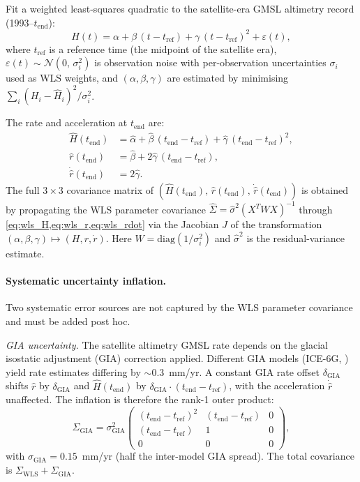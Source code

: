 \documentclass[11pt]{article}
\newcommand{\tend}{t_{\mathrm{end}}}
\begin{document}
Fit a weighted least-squares quadratic to the satellite-era GMSL altimetry record (1993--$\tend$):
\begin{equation}
  H(t) = \alpha + \beta\,(t - t_{\mathrm{ref}}) + \gamma\,(t - t_{\mathrm{ref}})^2 + \varepsilon(t),
  \label{eq:wls_model}
\end{equation}
where $t_{\mathrm{ref}}$ is a reference time (the midpoint of the satellite era), $\varepsilon(t) \sim \mathcal{N}(0,\,\sigma_i^2)$ is observation noise with per-observation uncertainties $\sigma_i$ used as WLS weights, and $(\alpha, \beta, \gamma)$ are estimated by minimising $\sum_i (H_i - \hat{H}_i)^2 / \sigma_i^2$.

The rate and acceleration at $\tend$ are:
\begin{align}
  \hat{H}(\tend) &= \hat\alpha + \hat\beta\,(\tend - t_{\mathrm{ref}}) + \hat\gamma\,(\tend - t_{\mathrm{ref}})^2, \label{eq:wls_H}\\
  \hat{r}(\tend) &= \hat\beta + 2\hat\gamma\,(\tend - t_{\mathrm{ref}}), \label{eq:wls_r}\\
  \dot{\hat{r}}(\tend) &= 2\hat\gamma. \label{eq:wls_rdot}
\end{align}
The full $3 \times 3$ covariance matrix of $(\hat{H}(\tend),\, \hat{r}(\tend),\, \dot{\hat{r}}(\tend))$ is obtained by propagating the WLS parameter covariance $\hat\Sigma = \hat\sigma^2 (X^T W X)^{-1}$ through \cref{eq:wls_H,eq:wls_r,eq:wls_rdot} via the Jacobian $J$ of the transformation $(\alpha, \beta, \gamma) \mapsto (H, r, \dot{r})$.  Here $W = \mathrm{diag}(1/\sigma_i^2)$ and $\hat\sigma^2$ is the residual-variance estimate.

\paragraph{Systematic uncertainty inflation.}

Two systematic error sources are not captured by the WLS parameter covariance and must be added post hoc.

\textit{GIA uncertainty.}  The satellite altimetry GMSL rate depends on the glacial isostatic adjustment (GIA) correction applied.  Different GIA models (ICE-6G, \citealt{Caron2018}) yield rate estimates differing by $\sim$0.3~mm/yr.  A constant GIA rate offset $\delta_{\mathrm{GIA}}$ shifts $\hat{r}$ by $\delta_{\mathrm{GIA}}$ and $\hat{H}(\tend)$ by $\delta_{\mathrm{GIA}} \cdot (\tend - t_{\mathrm{ref}})$, with the acceleration $\dot{\hat{r}}$ unaffected.  The inflation is therefore the rank-1 outer product:
\begin{equation}
  \Sigma_{\mathrm{GIA}} = \sigma_{\mathrm{GIA}}^2 \begin{pmatrix} (\tend - t_{\mathrm{ref}})^2 & (\tend - t_{\mathrm{ref}}) & 0 \\ (\tend - t_{\mathrm{ref}}) & 1 & 0 \\ 0 & 0 & 0 \end{pmatrix},
  \label{eq:gia_inflation}
\end{equation}
with $\sigma_{\mathrm{GIA}} = 0.15$~mm/yr (half the inter-model GIA spread).  The total covariance is $\Sigma_{\mathrm{WLS}} + \Sigma_{\mathrm{GIA}}$.
\end{document}
